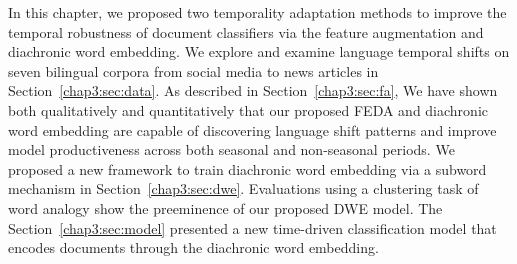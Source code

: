 In this chapter, we proposed two temporality adaptation methods to improve the temporal robustness of document classifiers via the feature augmentation and diachronic word embedding.
We explore and examine language temporal shifts on seven bilingual corpora from social media to news articles in Section~\ref{chap3:sec:data}. 
As described in Section~\ref{chap3:sec:fa}, We have shown both qualitatively and quantitatively that our proposed FEDA and diachronic word embedding are capable of discovering language shift patterns and improve model productiveness across both seasonal and non-seasonal periods.
We proposed a new framework to train diachronic word embedding via a subword mechanism in Section~\ref{chap3:sec:dwe}.
Evaluations using a clustering task of word analogy show the preeminence of our proposed DWE model.
The Section~\ref{chap3:sec:model} presented a new time-driven classification model that encodes documents through the diachronic word embedding. 
